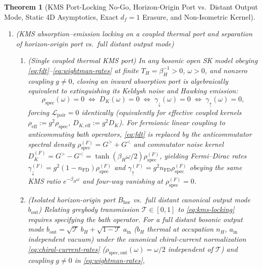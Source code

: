 \documentclass[11pt,a4paper]{article}
\newtheorem{theorem}{Theorem}
\theoremstyle{definition}
\theoremstyle{remark}
\newcommand{\cL}{\mathcal{L}}
\newcommand{\cT}{\mathcal{T}}
\newcommand{\1}{\mathbf{1}}
\begin{document}
\begin{theorem}[KMS Port-Locking No-Go, Horizon-Origin Port vs.\ Distant Output Mode, Static 4D Asymptotics, Exact $d_f=1$ Erasure, and Non-Isometric Kernel]\label{thm:throat}
\leavevmode
\begin{enumerate}
  \item[(a)] \emph{(KMS absorption--emission locking on a coupled thermal port and separation of horizon-origin port vs.\ full distant output mode)}
  \begin{enumerate}
    \item[(i)] \emph{(Single coupled thermal KMS port)} In any bosonic open SK model obeying \eqref{eq:fdt}--\eqref{eq:wightman-rates} at finite $T_H = \beta_H^{-1} > 0$, $\omega > 0$, and \emph{nonzero coupling $g \neq 0$}, closing an inward absorption port is algebraically equivalent to extinguishing its Keldysh noise and Hawking emission:
    \begin{equation}\label{eq:kms-locking}
      \rho_{\mathrm{spec}}(\omega) = 0 \;\Longleftrightarrow\; D_K(\omega) = 0 \;\Longleftrightarrow\; \gamma_\downarrow(\omega) = 0 \;\Longleftrightarrow\; \gamma_\uparrow(\omega) = 0,
    \end{equation}
    forcing $\cL_{\mathrm{pair}}=0$ identically (equivalently for effective coupled kernels $\rho_{\mathrm{eff}}:=g^2\rho_{\mathrm{spec}}$, $D_{K,\mathrm{eff}}:=g^2 D_K$). For fermionic linear coupling to anticommuting bath operators, \eqref{eq:fdt} is replaced by the anticommutator spectral density $\rho_{\mathrm{spec}}^{(F)}=G^>+G^<$ and commutator noise kernel $D_K^{(F)}=G^>-G^<=\tanh(\beta_H\omega/2)\rho_{\mathrm{spec}}^{(F)}$, yielding Fermi--Dirac rates $\gamma_\downarrow^{(F)}=g^2(1-n_{\mathrm{FD}})\rho_{\mathrm{spec}}^{(F)}$ and $\gamma_\uparrow^{(F)}=g^2 n_{\mathrm{FD}}\rho_{\mathrm{spec}}^{(F)}$ obeying the same KMS ratio $e^{-\beta_H\omega}$ and four-way vanishing at $\rho_{\mathrm{spec}}^{(F)}=0$.
    \item[(ii)] \emph{(Isolated horizon-origin port $B_{\mathrm{hor}}$ vs.\ full distant canonical output mode $b_{\mathrm{out}}$)} Relating greybody transmission $\cT\in[0,1]$ to \eqref{eq:kms-locking} requires specifying the bath operator. For a \emph{full distant bosonic output mode} $b_{\mathrm{out}} = \sqrt{\cT}\,b_H + \sqrt{1-\cT}\,a_{\mathrm{in}}$ ($b_H$ thermal at occupation $n_H$, $a_{\mathrm{in}}$ independent vacuum) under the canonical chiral-current normalization \eqref{eq:chiral-current-rates} ($\rho_{\mathrm{spec,out}}(\omega)=\omega/2$ independent of $\cT$) and coupling $g\neq 0$ in \eqref{eq:wightman-rates},

\end{enumerate}
\end{enumerate}
\end{theorem}
\end{document}
